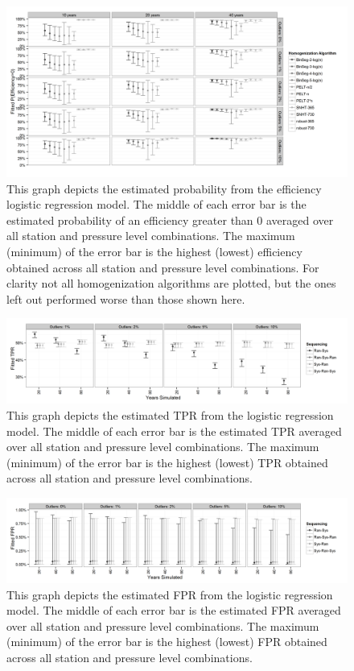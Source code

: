 \documentclass[12pt]{article}
\begin{document}
\begin{figure}[h!]
	\centering
	\includegraphics[width=\textwidth]{Efficiency_Model_Plot_BW}
	\caption{This graph depicts the estimated probability from the efficiency logistic regression model.  The middle of each error bar is the estimated probability of an efficiency greater than 0 averaged over all station and pressure level combinations.  The maximum (minimum) of the error bar is the highest (lowest) efficiency obtained across all station and pressure level combinations.  For clarity not all homogenization algorithms are plotted, but the ones left out performed worse than those shown here.}
	\label{fig:homFitEff}
\end{figure}

\begin{figure}[h!]
	\centering
	\includegraphics[width=\textwidth]{TPR_Order_Plot_BW}
	\caption{This graph depicts the estimated TPR from the logistic regression model.  The middle of each error bar is the estimated TPR averaged over all station and pressure level combinations.  The maximum (minimum) of the error bar is the highest (lowest) TPR obtained across all station and pressure level combinations.}
	\label{fig:fitTPR}
\end{figure}

\begin{figure}[h!]
	\centering
	\includegraphics[width=\textwidth]{FPR_Order_Plot_BW}
	\caption{This graph depicts the estimated FPR from the logistic regression model.  The middle of each error bar is the estimated FPR averaged over all station and pressure level combinations.  The maximum (minimum) of the error bar is the highest (lowest) FPR obtained across all station and pressure level combinations.}
	\label{fig:fitFPR}
\end{figure}
\end{document}
